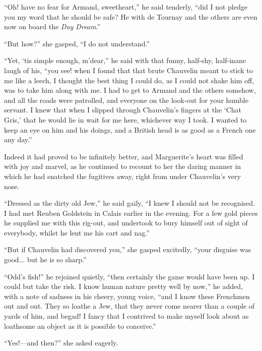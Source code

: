 \documentclass[paper=5.5in:8.5in,BCOR=7mm,twoside,DIV=calc,12pt,usegeometry,chapterprefix,endperiod,headings=big]{scrbook}
\begin{document}
\enquote{Oh! have no fear for Armand, sweetheart,} he said tenderly, \enquote{did I not pledge you my word that he should be safe? He with de Tournay and the others are even now on board the \textit{Day Dream}.}

\enquote{But how?} she gasped, \enquote{I do not understand.}

\enquote{Yet, `tis simple enough, m'dear,} he said with that funny, half-shy, half-inane laugh of his, \enquote{you see! when I found that that brute Chauvelin meant to stick to me like a leech, I thought the best thing I could do, as I could not shake him off, was to take him along with me. I had to get to Armand and the others somehow, and all the roads were patrolled, and everyone on the look-out for your humble servant. I knew that when I slipped through Chauvelin's fingers at the \enquote{Chat Gris,} that he would lie in wait for me here, whichever way I took. I wanted to keep an eye on him and his doings, and a British head is as good as a French one any day.}

Indeed it had proved to be infinitely better, and Marguerite's heart was filled with joy and marvel, as he continued to recount to her the daring manner in which he had snatched the fugitives away, right from under Chauvelin's very nose.

\enquote{Dressed as the dirty old Jew,} he said gaily, \enquote{I knew I should not be recognised. I had met Reuben Goldstein in Calais earlier in the evening. For a few gold pieces he supplied me with this rig-out, and undertook to bury himself out of sight of everybody, whilst he lent me his cart and nag.}

\enquote{But if Chauvelin had discovered you,} she gasped excitedly, \enquote{your disguise was good... but he is so sharp.}

\enquote{Odd's fish!} he rejoined quietly, \enquote{then certainly the game would have been up. I could but take the risk. I know human nature pretty well by now,} he added, with a note of sadness in his cheery, young voice, \enquote{and I know these Frenchmen out and out. They so loathe a Jew, that they never come nearer than a couple of yards of him, and begad! I fancy that I contrived to make myself look about as loathsome an object as it is possible to conceive.}

\enquote{Yes!---and then?} she asked eagerly.
\end{document}
